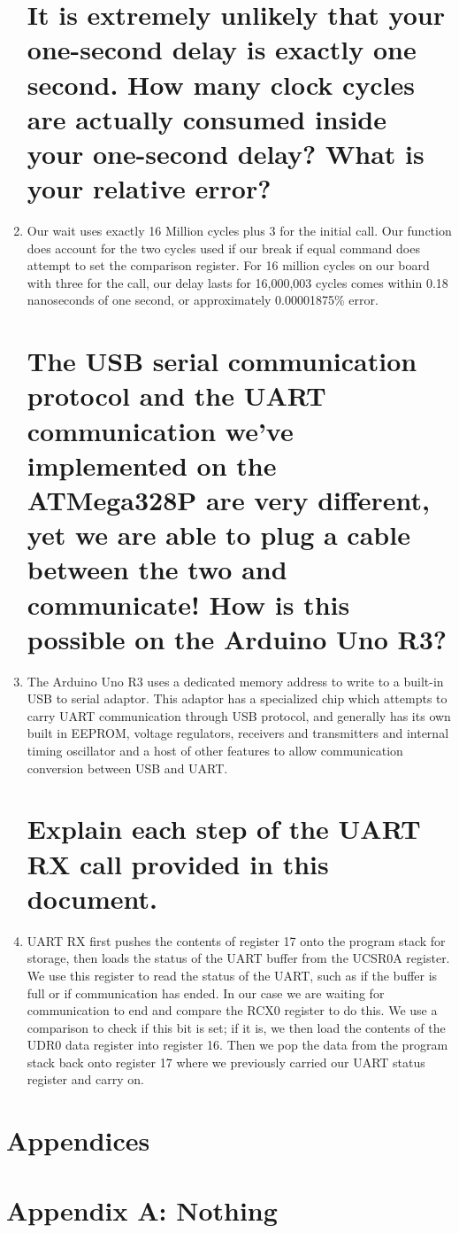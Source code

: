\documentclass[letterpaper,11pt]{texMemo} %
\begin{document}
\begin{enumerate}

\section{It is extremely unlikely that your one-second delay is exactly one second. How many clock
cycles are actually consumed inside your one-second delay? What is your relative error?}

\item Our wait uses exactly 16 Million cycles plus 3 for the initial call. Our function does account for the two cycles used if our break if equal command does attempt to set the comparison register. For 16 million cycles on our board with three for the call, our delay lasts for 16,000,003 cycles comes within 0.18 nanoseconds of one second, or approximately 0.00001875\% error.

\section{The USB serial communication protocol and the UART communication we’ve implemented
on the ATMega328P are very different, yet we are able to plug a cable between the two and
communicate! How is this possible on the Arduino Uno R3?}

\item The Arduino Uno R3 uses a dedicated memory address to write to a built-in USB to serial adaptor. This adaptor has a specialized chip which attempts to carry UART communication through USB protocol, and generally has its own built in EEPROM, voltage regulators, receivers and transmitters and internal timing oscillator and a host of other features to allow communication conversion between USB and UART.

\section{Explain each step of the UART RX call provided in this document.}

\item UART RX first pushes the contents of register 17 onto the program stack for storage, then loads the status of the UART buffer from the UCSR0A register. We use this register to read the status of the UART, such as if the buffer is full or if communication has ended. In our case we are waiting for communication to end and compare the RCX0 register to do this. We use a comparison to check if this bit is set; if it is, we then load the contents of the UDR0 data register into register 16. Then we pop the data from the program stack back onto register 17 where we previously carried our UART status register and carry on.

\end{enumerate}

\section*{Appendices}

\newpage

\section*{Appendix A: Nothing}

\end{document}
